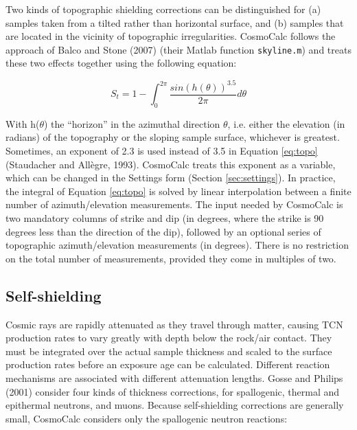 \documentclass{article}
\begin{document}
Two kinds  of topographic  shielding corrections can  be distinguished
for (a)  samples taken from  a tilted rather than  horizontal surface,
and  (b) samples  that  are  located in  the  vicinity of  topographic
irregularities.   CosmoCalc follows  the approach  of Balco  and Stone
(2007) (their Matlab function \texttt{skyline.m}) and treats these two
effects together using the following equation:

\begin{equation}
  \label{eq:topo}
  S_t = 1 - \int_0^{2 \pi}\frac{sin(h(\theta))^{3.5}}{2 \pi}d\theta
\end{equation}

With h($\theta$) the ``horizon''  in the azimuthal direction $\theta$,
i.e.   either the  elevation (in  radians)  of the  topography or  the
sloping sample surface, whichever is greatest.  Sometimes, an exponent
of 2.3  is used instead  of 3.5 in Equation  \ref{eq:topo} (Staudacher
and All\`{e}gre, 1993). CosmoCalc  treats this exponent as a variable,
which    can   be    changed   in    the   Settings    form   (Section
\ref{sec:settings}).    In   practice,   the  integral   of   Equation
\ref{eq:topo}  is  solved by  linear  interpolation  between a  finite
number  of  azimuth/elevation   measurements.   The  input  needed  by
CosmoCalc  is two  mandatory columns  of strike  and dip  (in degrees,
where the  strike is 90 degrees  less than the direction  of the dip),
followed  by  an  optional  series  of  topographic  azimuth/elevation
measurements (in degrees). There is no restriction on the total number
of measurements, provided they come in multiples of two.

\subsection{Self-shielding}\label{eq:self}

Cosmic  rays are  rapidly attenuated  as they  travel  through matter,
causing  TCN production  rates to  vary greatly  with depth  below the
rock/air  contact.  They  must be  integrated over  the  actual sample
thickness  and  scaled  to  the  surface production  rates  before  an
exposure  age can  be calculated.   Different reaction  mechanisms are
associated  with  different attenuation  lengths.   Gosse and  Philips
(2001) consider four kinds  of thickness corrections, for spallogenic,
thermal  and epithermal neutrons,  and muons.   Because self-shielding
corrections  are   generally  small,  CosmoCalc   considers  only  the
spallogenic neutron reactions:
\end{document}
